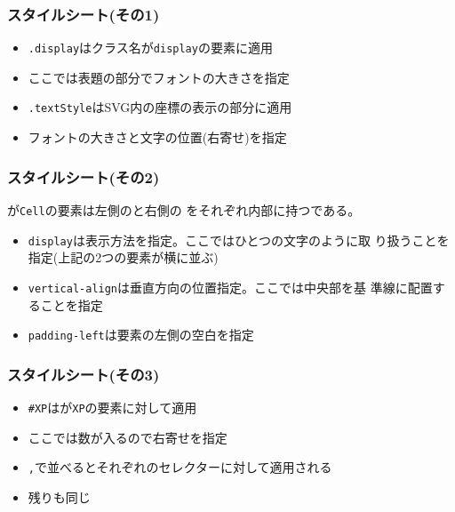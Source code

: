  \begin{frame}[containsverbatim]
  \frametitle{スタイルシート(その1)}
  \begin{itemize}
   \item \texttt{.display}はクラス名が\texttt{display}の要素に適用
   \item ここでは表題の部分でフォントの大きさを指定
   \item \texttt{.textStyle}はSVG内の座標の表示の部分に適用
   \item フォントの大きさと文字の位置(右寄せ)を指定
  \end{itemize}
 \end{frame}
\begin{frame}[containsverbatim]
  \frametitle{スタイルシート(その2)}
 が\texttt{Cell}の要素は左側のと右側の
 をそれぞれ内部に持つである。
 \begin{itemize}
  \item \texttt{display}は表示方法を指定。ここではひとつの文字のように取
        り扱うことを指定(上記の2つの要素が横に並ぶ)
  \item \texttt{vertical-align}は垂直方向の位置指定。ここでは中央部を基
        準線に配置することを指定
  \item \texttt{padding-left}は要素の左側の空白を指定
 \end{itemize}
 \end{frame}
\begin{frame}[containsverbatim]
  \frametitle{スタイルシート(その3)}
 \begin{itemize}
  \item \texttt{\#XP}はが\texttt{XP}の要素に対して適用
  \item ここでは数が入るので右寄せを指定
  \item \texttt{,}で並べるとそれぞれのセレクターに対して適用される
  \item 残りも同じ
 \end{itemize}
\end{frame}
